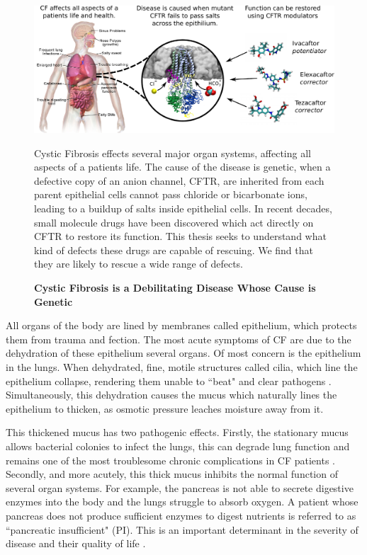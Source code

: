 \begin{figure}
	\label{CF_summary}
	\begin{center}
	\includegraphics[width=1\textwidth]{figures/cf_summary_fig.pdf}
	\end{center}
	\captionsetup{singlelinecheck = false, justification=raggedright}
	\caption[Cystic Fibrosis is a Debilitating Disease Whose Cause is Genetic] {\textbf{Cystic Fibrosis is a Debilitating Disease Whose Cause is Genetic}}{Cystic Fibrosis effects several major organ systems, affecting all aspects of a patients life. The cause of the disease is genetic, when a defective copy of an anion channel, CFTR, are inherited from each parent epithelial cells cannot pass chloride or bicarbonate ions, leading to a buildup of salts inside epithelial cells. In recent decades, small molecule drugs have been discovered which act directly on CFTR to restore its function. This thesis seeks to understand what kind of defects these drugs are capable of rescuing. We find that they are likely to rescue a wide range of defects.} 
\end{figure}

All organs of the body are lined by membranes called epithelium, which protects them from trauma and fection. The most acute symptoms of CF are due to the dehydration of these epithelium several organs. Of most concern is the epithelium in the lungs. When dehydrated, fine, motile structures called cilia, which line the epithelium collapse, rendering them unable to ``beat" and clear pathogens \cite{boucher2007}. Simultaneously, this dehydration causes the mucus which naturally lines the epithelium to thicken, as osmotic pressure leaches moisture away from it. 

This thickened mucus has two pathogenic effects. Firstly, the stationary mucus allows bacterial colonies to infect the lungs, this can degrade lung function and remains one of the most troublesome chronic complications in CF patients \cite{}. Secondly, and more acutely, this thick mucus inhibits the normal function of several organ systems. For example, the pancreas is not able to secrete digestive enzymes into the body and the lungs struggle to absorb oxygen. A patient whose pancreas does not produce sufficient enzymes to digest nutrients is referred to as ``pancreatic insufficient" (PI). This is an important determinant in the severity of disease and their quality of life \cite{}.

